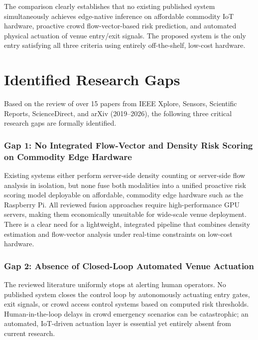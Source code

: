 \documentclass[12pt,a4paper]{article}
\begin{document}
The comparison clearly establishes that no existing published system simultaneously achieves edge-native inference on affordable commodity IoT hardware, proactive crowd flow-vector-based risk prediction, and automated physical actuation of venue entry/exit signals. The proposed system is the only entry satisfying all three criteria using entirely off-the-shelf, low-cost hardware.

\section{Identified Research Gaps}

Based on the review of over 15 papers from IEEE Xplore, Sensors, Scientific Reports, ScienceDirect, and arXiv (2019--2026), the following three critical research gaps are formally identified.

\subsubsection*{Gap 1: No Integrated Flow-Vector and Density Risk Scoring on Commodity Edge Hardware}
Existing systems either perform server-side density counting or server-side flow analysis in isolation, but none fuse both modalities into a unified proactive risk scoring model deployable on affordable, commodity edge hardware such as the Raspberry Pi. All reviewed fusion approaches require high-performance GPU servers, making them economically unsuitable for wide-scale venue deployment. There is a clear need for a lightweight, integrated pipeline that combines density estimation and flow-vector analysis under real-time constraints on low-cost hardware.

\subsubsection*{Gap 2: Absence of Closed-Loop Automated Venue Actuation}
The reviewed literature uniformly stops at alerting human operators. No published system closes the control loop by autonomously actuating entry gates, exit signals, or crowd access control systems based on computed risk thresholds. Human-in-the-loop delays in crowd emergency scenarios can be catastrophic; an automated, IoT-driven actuation layer is essential yet entirely absent from current research.

\end{document}
